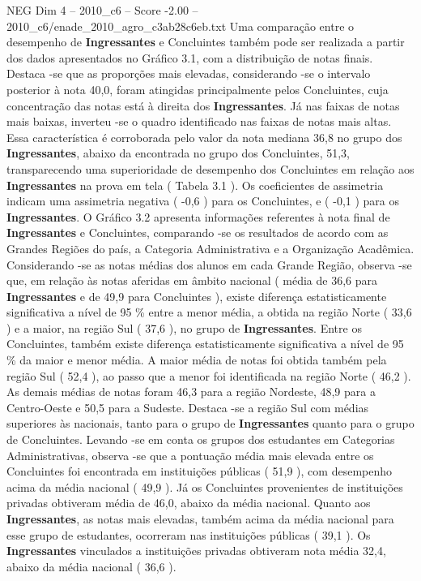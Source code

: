 \begin{textsample}{NEG Dim 4 – 2010\_c6 – Score -2.00 – 2010\_c6/enade\_2010\_agro\_c3ab28c6eb.txt}
Uma comparação entre o desempenho de \textbf{Ingressantes} e Concluintes também pode ser realizada a partir dos dados apresentados no Gráfico 3.1, com a distribuição de notas finais.
Destaca -se que as proporções mais elevadas, considerando -se o intervalo posterior à nota 40,0, foram atingidas principalmente pelos Concluintes, cuja concentração das notas está à direita dos \textbf{Ingressantes}.
Já nas faixas de notas mais baixas, inverteu -se o quadro identificado nas faixas de notas mais altas.
Essa característica é corroborada pelo valor da nota mediana 36,8 no grupo dos \textbf{Ingressantes}, abaixo da encontrada no grupo dos Concluintes, 51,3, transparecendo uma superioridade de desempenho dos Concluintes em relação aos \textbf{Ingressantes} na prova em tela ( Tabela 3.1 ).
Os coeficientes de assimetria indicam uma assimetria negativa ( -0,6 ) para os Concluintes, e ( -0,1 ) para os \textbf{Ingressantes}.
O Gráfico 3.2 apresenta informações referentes à nota final de \textbf{Ingressantes} e Concluintes, comparando -se os resultados de acordo com as Grandes Regiões do país, a Categoria Administrativa e a Organização Acadêmica.
Considerando -se as notas médias dos alunos em cada Grande Região, observa -se que, em relação às notas aferidas em âmbito nacional ( média de 36,6 para \textbf{Ingressantes} e de 49,9 para Concluintes ), existe diferença estatisticamente significativa a nível de 95 \% entre a menor média, a obtida na região Norte ( 33,6 ) e a maior, na região Sul ( 37,6 ), no grupo de \textbf{Ingressantes}.
Entre os Concluintes, também existe diferença estatisticamente significativa a nível de 95 \% da maior e menor média.
A maior média de notas foi obtida também pela região Sul ( 52,4 ), ao passo que a menor foi identificada na região Norte ( 46,2 ).
As demais médias de notas foram 46,3 para a região Nordeste, 48,9 para a Centro-Oeste e 50,5 para a Sudeste.
Destaca -se a região Sul com médias superiores às nacionais, tanto para o grupo de \textbf{Ingressantes} quanto para o grupo de Concluintes.
Levando -se em conta os grupos dos estudantes em Categorias Administrativas, observa -se que a pontuação média mais elevada entre os Concluintes foi encontrada em instituições públicas ( 51,9 ), com desempenho acima da média nacional ( 49,9 ).
Já os Concluintes provenientes de instituições privadas obtiveram média de 46,0, abaixo da média nacional.
Quanto aos \textbf{Ingressantes}, as notas mais elevadas, também acima da média nacional para esse grupo de estudantes, ocorreram nas instituições públicas ( 39,1 ).
Os \textbf{Ingressantes} vinculados a instituições privadas obtiveram nota média 32,4, abaixo da média nacional ( 36,6 ).

\end{textsample}
